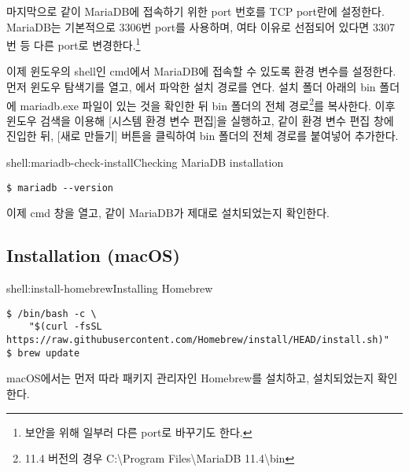 마지막으로 \와 같이 MariaDB에 접속하기 위한 port 번호를 TCP port란에 설정한다. MariaDB는 기본적으로 3306번 port를 사용하며, 여타 이유로 선점되어 있다면 3307번 등 다른 port로 변경한다.\footnote{보안을 위해 일부러 다른 port로 바꾸기도 한다.}


이제 윈도우의 shell인 cmd에서 MariaDB에 접속할 수 있도록 환경 변수를 설정한다. 먼저 윈도우 탐색기를 열고, 에서 파악한 설치 경로를 연다. 설치 폴더 아래의 bin 폴더에 mariadb.exe 파일이 있는 것을 확인한 뒤 bin 폴더의 전체 경로\footnote{11.4 버전의 경우 C:\textbackslash{}Program Files\textbackslash{}MariaDB 11.4\textbackslash{}bin}를 복사한다. 이후 윈도우 검색을 이용해 [시스템 환경 변수 편집]을 실행하고, \과 같이 환경 변수 편집 창에 진입한 뒤, [새로 만들기] 버튼을 클릭하여 bin 폴더의 전체 경로를 붙여넣어 추가한다.

\begin{shell}{shell:mariadb-check-install}{Checking MariaDB installation}
\begin{verbatim}
$ mariadb --version
\end{verbatim}
\end{shell}

이제 cmd 창을 열고, \와 같이 MariaDB가 제대로 설치되었는지 확인한다.

\subsection*{Installation (macOS)}

\begin{shell}{shell:install-homebrew}{Installing Homebrew}
\begin{verbatim}
$ /bin/bash -c \
    "$(curl -fsSL https://raw.githubusercontent.com/Homebrew/install/HEAD/install.sh)"
$ brew update
\end{verbatim}
\end{shell}

macOS에서는 먼저 \를 따라 패키지 관리자인 Homebrew를 설치하고, 설치되었는지 확인한다.

